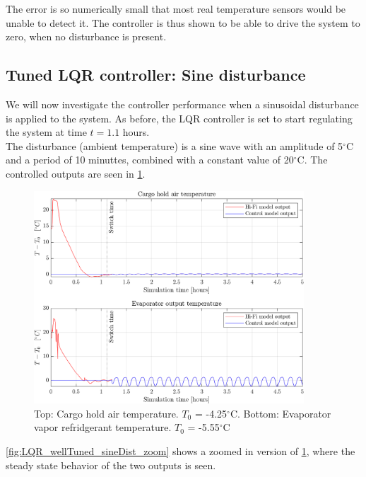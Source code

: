 The error is so numerically small that most real temperature sensors would be unable to detect it. The controller is thus shown to be able to drive the system to zero, when no disturbance is present.



\newpage
\subsection{Tuned LQR controller: Sine disturbance}
We will now investigate the controller performance when a sinusoidal disturbance is applied to the system. As before, the LQR controller is set to start regulating the system at time $t=1.1$ hours. \\


The disturbance (ambient temperature) is a sine wave with an amplitude of 5$^{\circ}$C and a period of 10 minuttes, combined with a constant value of 20$^{\circ}$C. The controlled outputs are seen in \cref{fig:LQR_wellTuned_sineDist}.\\


\begin{figure}[h!]
	\centering
	\includegraphics[width=0.9\textwidth]{Graphics/fig_LQR_wellTuned_sineDist.png}
	\caption{Top: Cargo hold air temperature. $T_0$ = -4.25$^{\circ}$C. Bottom: Evaporator vapor refridgerant temperature. $T_0$ = -5.55$^{\circ}$C}
	\label{fig:LQR_wellTuned_sineDist}
\end{figure}

\cref{fig:LQR_wellTuned_sineDist_zoom} shows a zoomed in version of \cref{fig:LQR_wellTuned_sineDist}, where the steady state behavior of the two outputs is seen.\\


